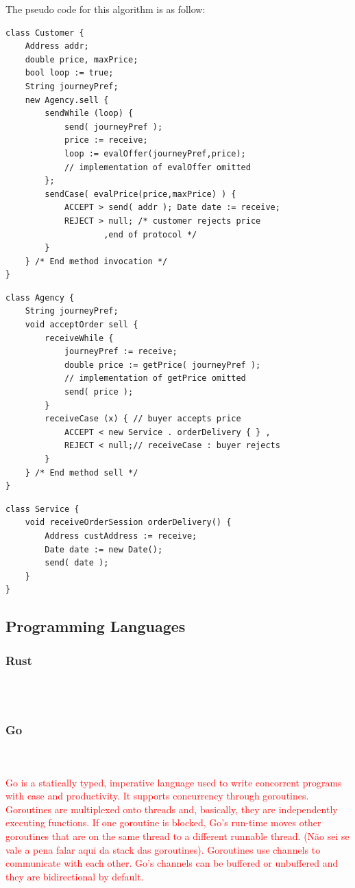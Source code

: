 \documentclass[runningheads]{llncs}
\begin{document}
The pseudo code for this algorithm is as follow:
\begin{lstlisting}[caption={Customer Algorithm},captionpos=b]
class Customer {
	Address addr;
	double price, maxPrice;
	bool loop := true;
	String journeyPref;
	new Agency.sell {
		sendWhile (loop) {
			send( journeyPref );
			price := receive;
			loop := evalOffer(journeyPref,price);
			// implementation of evalOffer omitted
		};
		sendCase( evalPrice(price,maxPrice) ) {
			ACCEPT > send( addr ); Date date := receive;
			REJECT > null; /* customer rejects price
					,end of protocol */ 
		}
	} /* End method invocation */
}
\end{lstlisting}
\begin{lstlisting}[caption={Agency Algorithm},captionpos=b]
class Agency {
	String journeyPref;
	void acceptOrder sell {
		receiveWhile {
			journeyPref := receive;
			double price := getPrice( journeyPref );
			// implementation of getPrice omitted
			send( price );
		}
		receiveCase (x) { // buyer accepts price
			ACCEPT < new Service . orderDelivery { } ,
			REJECT < null;// receiveCase : buyer rejects 
        }
	} /* End method sell */
}
\end{lstlisting}
\begin{lstlisting}[caption={Service Algorithm},captionpos=b]
class Service {
	void receiveOrderSession orderDelivery() {
		Address custAddress := receive;
		Date date := new Date();
		send( date );
	}
}
\end{lstlisting}
\subsection{Programming Languages}
\subsubsection{Rust}\hfill\\\\
\subsubsection{Go}\hfill\\\\
\textcolor{red}{Go is a statically typed, imperative language	used to write concorrent programs with ease and productivity. It supports concurrency through goroutines. Goroutines are multiplexed onto threads and, basically, they are independently executing functions. If one goroutine is blocked, Go's run-time moves other goroutines that are on the same thread to a different runnable thread. (Não sei se vale a pena falar aqui da stack das goroutines). Goroutines use channels to communicate with each other. Go's channels can be buffered or unbuffered and they are bidirectional by default.}
\end{document}
